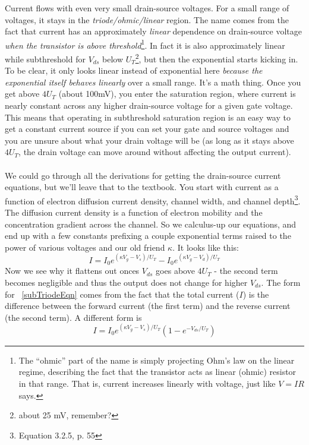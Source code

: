 Current flows with even very small drain-source voltages. For a small range of voltages, it stays in the \emph{triode/ohmic/linear} region. The name comes from the fact that current has an approximately \emph{linear} dependence on drain-source voltage \emph{when the transistor is above threshold}\footnote{The ``ohmic'' part of the name is simply projecting Ohm's law on the linear regime, describing the fact that the transistor acts as linear (ohmic) resistor in that range. That is, current increases linearly with voltage, just like $V=IR$ says.}. In fact it is also approximately linear while subthreshold for $V_{ds}$ below $U_T$\footnote{about 25 mV, remember?}, but then the exponential starts kicking in. To be clear, it only looks linear instead of exponential here \emph{because the exponential itself behaves linearly} over a small range. It's a math thing. Once you get above $4U_T$ (about 100mV), you enter the saturation region, where current is nearly constant across any higher drain-source voltage for a given gate voltage. This means that operating in subthreshold saturation region is an easy way to get a constant current source if you can set your gate and source voltages and you are unsure about what your drain voltage will be (as long as it stays above $4U_T$, the drain voltage can move around without affecting the output current).\\ \\
We could go through all the derivations for getting the drain-source current equations, but we'll leave that to the textbook. You start with current as a function of electron diffusion current density, channel width, and channel depth\footnote{Equation 3.2.5, p. 55}. The diffusion current density is a function of electron mobility and the concentration gradient across the channel. So we calculus-up our equations, and end up with a few constants prefixing a couple exponential terms raised to the power of various voltages and our old friend $\kappa$. It looks like this:
\begin{equation}
I = I_0 e^{(\kappa V_g - V_s)/U_T} - I_0 e^{(\kappa V_g - V_{d})/U_T}
\label{subTriodeEqn}
\end{equation}
Now we see why it flattens out onces $V_{ds}$ goes above $4U_T$ - the second term becomes negligible and thus the output does not change for higher $V_{ds}$. The form for ~\eqref{subTriodeEqn} comes from the fact that the total current ($I$) is the difference between the forward current (the first term) and the reverse current (the second term). A different form is
\begin{equation}
I = I_0 e^{(\kappa V_g - V_s)/U_T}(1 - e^{-V_{ds}/U_T})
\end{equation}
